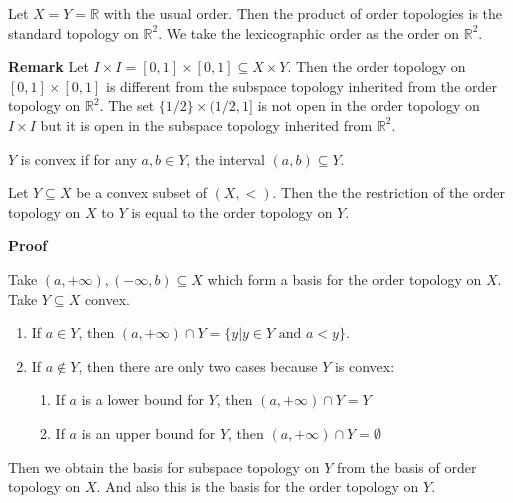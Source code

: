 \documentclass[main.tex]{subfiles}
\begin{document}
\begin{example}
    Let $X = Y = \mathbb{R}$ with the usual order. Then the product of order topologies is the standard topology on \(\mathbb{R}^2\). We take the lexicographic order as the order on \(\mathbb{R}^2\).  
\end{example}
\par \noindent \textbf{Remark} Let $I\times I = [0, 1]\times [0, 1] \subseteq X \times Y$. Then the order topology on $[0, 1] \times [0, 1]$ is different from the subspace topology inherited from the order topology on $\mathbb{R}^2$. The set $\{1/2\} \times (1/2, 1]$ is not open in the order topology on $I \times I$ but it is open in the subspace topology inherited from $\mathbb{R}^2$.
\begin{definition}
    $Y$ is convex if for any $a, b \in Y$, the interval $(a, b) \subseteq Y$. 
\end{definition}
\begin{theorem}
    Let $Y \subseteq X$ be a convex subset of $(X, <)$. Then the the restriction of the order topology on $X$ to $Y$ is equal to the order topology on $Y$.
\end{theorem}

\par \noindent \textbf{Proof} 
\par Take $(a, +\infty), (-\infty, b) \subseteq X$ which form a basis for the order topology on $X$. Take $Y \subseteq X$ convex. 
\begin{enumerate}
    \item If $a\in Y$, then \((a, +\infty) \cap Y = \{y| y\in Y \text{ and } a < y\}\).  
    \item If $a \notin Y$, then there are only two cases because $Y$ is convex:
    \begin{enumerate}
        \item If $a$ is a lower bound for $Y$, then \((a, +\infty) \cap Y = Y\)
        \item If $a$ is an upper bound for $Y$, then $(a, +\infty) \cap Y = \emptyset$
    \end{enumerate} 
\end{enumerate}
Then we obtain the basis for subspace topology on $Y$ from the basis of order topology on $X$. 
And also this is the basis for the order topology on $Y$. 
\end{document}
